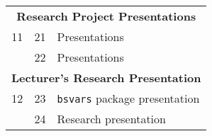 \documentclass[10pt]{article}
\begin{document}
\begin{multicols}{2}
\begin{center}
\begin{tabular}{c c l}
\multicolumn{3}{c}{\textbf{Research Project Presentations}}\\
11 & 21 & Presentations \\
    & 22 & Presentations \\ [1ex]
\multicolumn{3}{c}{\textbf{Lecturer's Research Presentation}}\\
12 & 23  & \texttt{bsvars} package presentation\\
   & 24  & Research presentation\\[1ex]
\bottomrule
\end{tabular}
\end{center}

\end{multicols}











\newpage
\end{document}
